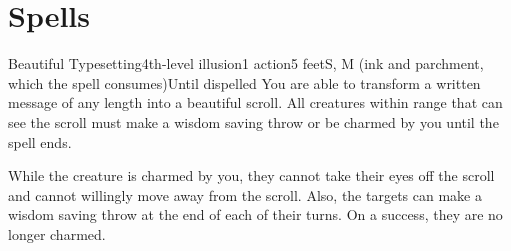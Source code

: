 \documentclass[10pt,twoside,twocolumn,openany,bg=full,nomultitoc]{dndbook}
\begin{document}
\section{Spells}
\label{sec:orgdc9aff0}

\begin{spell}{Beautiful Typesetting}{4th-level illusion}{1 action}{5 feet}{S, M (ink and parchment, which the spell consumes)}{Until dispelled}
You are able to transform a written message of any length into a beautiful
scroll. All creatures within range that can see the scroll must make a wisdom
saving throw or be charmed by you until the spell ends.

While the creature is charmed by you, they cannot take their eyes off the
scroll and cannot willingly move away from the scroll. Also, the targets can
make a wisdom saving throw at the end of each of their turns. On a success,
they are no longer charmed.
\end{spell}

\lipsum[2]
\end{document}
